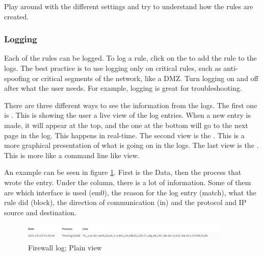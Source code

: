 
Play around with the different settings and try to understand how the rules are created.


\subsubsection{Logging}
Each of the rules can be logged. To log a rule, click on the  to add the rule to the logs. The best practice is to use logging only on critical rules, such as anti-spoofing or critical segments of the network, like a DMZ. Turn logging on and off after what the user needs. For example, logging is great for troubleshooting.


There are three different ways to see the information from the logs. The first one is . This is showing the user a live view of the log entries. When a new entry is made, it will appear at the top, and the one at the bottom will go to the next page in the log. This happens in real-time. The second view is the . This is a more graphical presentation of what is going on in the logs. The last view is the . This is more like a command line like view. 

An example can be seen in figure \ref{opnsense:firewall_log}. First is the Data, then the process that wrote the entry. Under the  column, there is a lot of information. Some of them are which interface is used (em0), the reason for the log entry (match), what the rule did (block), the direction of communication (in) and the protocol and IP source and destination.

\begin{figure}[h!]
    \centering
    \includegraphics[width=0.9\textwidth]{Images/firewall/log.PNG}
    \caption{\opnsense\ Firewall log; Plain view}
    \label{opnsense:firewall_log}
\end{figure}


